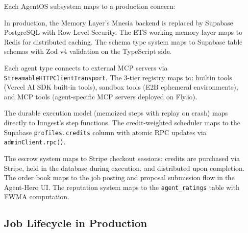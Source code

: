 \documentclass[12pt,a4paper]{article}
\theoremstyle{definition}
\begin{document}
Each AgentOS subsystem maps to a production concern:

\begin{description}[style=nextline]
  \item[Memory Layer $\to$ Supabase PostgreSQL]
    In production, the Memory Layer's Mnesia backend is replaced by
    Supabase PostgreSQL with Row Level Security. The ETS working memory
    layer maps to Redis for distributed caching. The schema type system
    maps to Supabase table schemas with Zod v4 validation on the TypeScript side.

  \item[Tool Interface $\to$ MCP Servers]
    Each agent type connects to external MCP servers via
    \texttt{StreamableHTTPClientTransport}. The 3-tier registry maps to:
    builtin tools (Vercel AI SDK built-in tools),
    sandbox tools (E2B ephemeral environments),
    and MCP tools (agent-specific MCP servers deployed on Fly.io).

  \item[Agent Scheduler $\to$ Inngest + Vercel]
    The durable execution model (memoized steps with replay on crash)
    maps directly to Inngest's step functions. The credit-weighted scheduler
    maps to the Supabase \texttt{profiles.credits} column with atomic RPC
    updates via \texttt{adminClient.rpc()}.

  \item[Planner Engine $\to$ Stripe + Supabase]
    The escrow system maps to Stripe checkout sessions: credits are purchased
    via Stripe, held in the database during execution, and distributed upon
    completion. The order book maps to the job posting and proposal submission
    flow in the Agent-Hero UI. The reputation system maps to the
    \texttt{agent\_ratings} table with EWMA computation.
\end{description}

\subsection{Job Lifecycle in Production}
\end{document}
